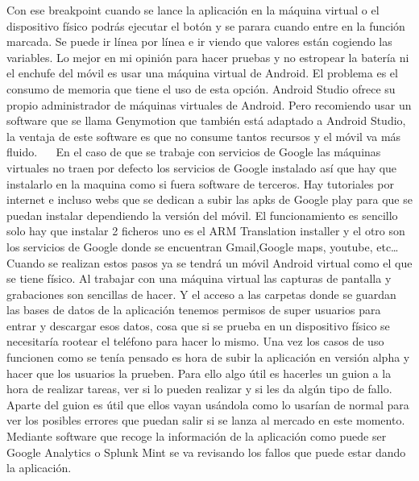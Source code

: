 Con ese breakpoint cuando se lance la aplicación en la máquina virtual o el dispositivo físico podrás ejecutar el botón y se parara cuando entre en la función marcada. Se puede ir línea por línea e ir viendo que valores están cogiendo las variables.
Lo mejor en mi opinión para hacer pruebas y no estropear la batería ni el enchufe del móvil es usar una máquina virtual de Android. El problema es el consumo de memoria que tiene el uso de esta opción. Android Studio ofrece su propio administrador de máquinas virtuales de Android. Pero recomiendo usar un software que se llama Genymotion que también está adaptado a Android Studio, la ventaja de este software es que no consume tantos recursos y el móvil va más fluido.
 
En el caso de que se trabaje con servicios de Google las máquinas virtuales no traen por defecto los servicios de Google instalado así que hay que instalarlo en la maquina como si fuera software de terceros. Hay tutoriales por internet e incluso webs que se dedican a subir las apks de Google play para que se puedan instalar dependiendo la versión del móvil.
El funcionamiento es sencillo solo hay que instalar 2 ficheros uno es el ARM Translation installer y el otro son los servicios de Google donde se encuentran Gmail,Google maps, youtube, etc…
Cuando se realizan estos pasos ya se tendrá un móvil Android virtual como el que se tiene físico.
Al trabajar con una máquina virtual las capturas de pantalla y grabaciones son sencillas de hacer. Y el acceso a las carpetas donde se guardan las bases de datos de la aplicación tenemos permisos de super usuarios para entrar y descargar esos datos, cosa que si se prueba en un dispositivo físico se necesitaría rootear el teléfono para hacer lo mismo.
Una vez los casos de uso funcionen como se tenía pensado es hora de subir la aplicación en versión alpha y hacer que los usuarios la prueben.
Para ello algo útil es hacerles un guion a la hora de realizar tareas, ver si lo pueden realizar y si les da algún tipo de fallo.
Aparte del guion es útil que ellos vayan usándola como lo usarían de normal para ver los posibles errores que puedan salir si se lanza al mercado en este momento.
Mediante software que recoge la información de la aplicación como puede ser Google Analytics o Splunk Mint se va revisando los fallos que puede estar dando la aplicación.

